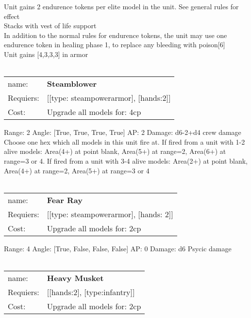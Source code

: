 Unit gains 2 endurence tokens per elite model in the unit. See general rules for effect\\ 
Stacks with vest of life support\\ 
In addition to the normal rules for endurence tokens, the unit may use one endurence token in healing phase 1, to replace any bleeding with poison[6]\\ 
Unit gains [4,3,3,3] in armor\\ 









\ \\
\begin{tabular}{ll}
name: & {\bf Steamblower } \\
Requiers: & [[type: steampowerarmor], [hands:2]] \\
Cost: & Upgrade all models for: 4cp \\
\end{tabular}



Range: 2  Angle: [True, True, True, True] AP: 2 Damage: d6-2+d4 crew damage \\
Choose one hex which all models in this unit fire at. If fired from a unit with 1-2 alive models: Area(4+) at point blank, Area(5+) at range=2, Area(6+) at range=3 or 4. If fired from a unit with 3-4 alive models: Area(2+) at point blank, Area(4+) at range=2, Area(5+) at range=3 or 4\\ 








\ \\
\begin{tabular}{ll}
name: & {\bf Fear Ray } \\
Requiers: & [[type: steampowerarmor], [hands: 2]] \\
Cost: & Upgrade all models for: 2cp \\
\end{tabular}



Range: 4  Angle: [True, False, False, False] AP: 0 Damage: d6 Psycic damage \\








\ \\
\begin{tabular}{ll}
name: & {\bf Heavy Musket } \\
Requiers: & [[hands:2], [type:infantry]] \\
Cost: & Upgrade all models for: 2cp \\
\end{tabular}



